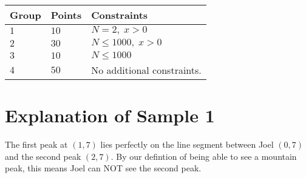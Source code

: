 \noindent
\begin{tabular}{| l | l | p{12cm} |}
  \hline
  \textbf{Group} & \textbf{Points} & \textbf{Constraints} \\ \hline
  $1$    & $10$       & $N = 2,\;x > 0$ \\ \hline
  $2$    & $30$       & $N \leq 1000,\;x > 0$ \\ \hline
  $3$    & $10$       & $N \leq 1000$ \\ \hline
  $4$    & $50$       & No additional constraints. \\ \hline
\end{tabular}

\section*{Explanation of Sample 1}
The first peak at $(1, 7)$ lies perfectly on the line segment between Joel $(0, 7)$ and the second peak $(2, 7)$.
By our defintion of being able to see a mountain peak, this means Joel can NOT see the second peak.

